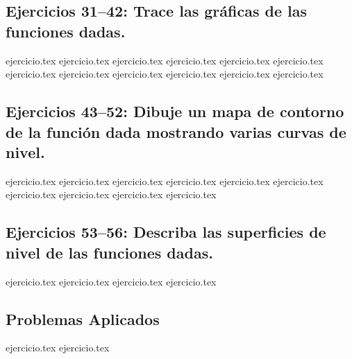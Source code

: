 \subsection*{Ejercicios 31--42: Trace las gráficas de las funciones dadas.}
\begin{enumerate}
    \setcounter{enumi}{30}
    {ejercicio.tex}
    {ejercicio.tex}
    {ejercicio.tex}
    {ejercicio.tex}
    {ejercicio.tex}
    {ejercicio.tex}
    {ejercicio.tex}
    {ejercicio.tex}
    {ejercicio.tex}
    {ejercicio.tex}
    {ejercicio.tex}
    {ejercicio.tex}
\end{enumerate}

\subsection*{Ejercicios 43--52: Dibuje un mapa de contorno de la función dada mostrando varias curvas de nivel.}
\begin{enumerate}
    \setcounter{enumi}{42}
    {ejercicio.tex}
    {ejercicio.tex}
    {ejercicio.tex}
    {ejercicio.tex}
    {ejercicio.tex}
    {ejercicio.tex}
    {ejercicio.tex}
    {ejercicio.tex}
    {ejercicio.tex}
    {ejercicio.tex}
\end{enumerate}

\subsection*{Ejercicios 53--56: Describa las superficies de nivel de las funciones dadas.}
\begin{enumerate}
    \setcounter{enumi}{52}
    {ejercicio.tex}
    {ejercicio.tex}
    {ejercicio.tex}
    {ejercicio.tex}
\end{enumerate}

\subsection*{Problemas Aplicados}
\begin{enumerate}
    \setcounter{enumi}{56}
    {ejercicio.tex}
    {ejercicio.tex}
\end{enumerate}


